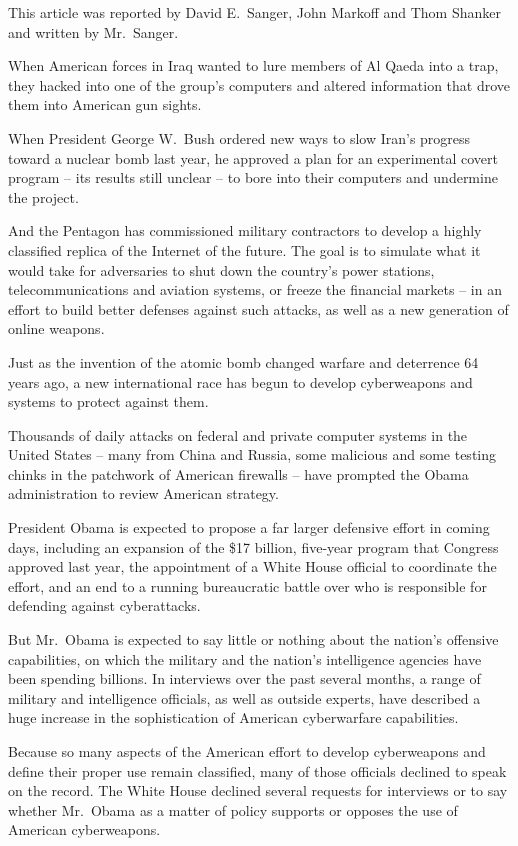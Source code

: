 \documentclass[12pt,a4paper,onecolumn]{article}
\begin{document}
This article was reported by David E.~Sanger, John Markoff and Thom Shanker and written by
Mr.~Sanger.

When American forces in Iraq wanted to lure members of Al Qaeda into a trap, they hacked into one of
the group's computers and altered information that drove them into American gun sights.

When President George W.~Bush ordered new ways to slow Iran's progress toward a nuclear bomb last
year, he approved a plan for an experimental covert program -- its results still unclear -- to bore
into their computers and undermine the project.

And the Pentagon has commissioned military contractors to develop a highly classified replica of the
Internet of the future. The goal is to simulate what it would take for adversaries to shut down the
country's power stations, telecommunications and aviation systems, or freeze the financial markets
-- in an effort to build better defenses against such attacks, as well as a new generation of online
weapons.

Just as the invention of the atomic bomb changed warfare and deterrence 64 years ago, a new
international race has begun to develop cyberweapons and systems to protect against them.

Thousands of daily attacks on federal and private computer systems in the United States -- many from
China and Russia, some malicious and some testing chinks in the patchwork of American firewalls --
have prompted the Obama administration to review American strategy.

President Obama is expected to propose a far larger defensive effort in coming days, including an
expansion of the \$17 billion, five-year program that Congress approved last year, the appointment
of a White House official to coordinate the effort, and an end to a running bureaucratic battle over
who is responsible for defending against cyberattacks.

But Mr.~Obama is expected to say little or nothing about the nation's offensive capabilities, on
which the military and the nation's intelligence agencies have been spending billions. In interviews
over the past several months, a range of military and intelligence officials, as well as outside
experts, have described a huge increase in the sophistication of American cyberwarfare capabilities.

Because so many aspects of the American effort to develop cyberweapons and define their proper use
remain classified, many of those officials declined to speak on the record. The White House declined
several requests for interviews or to say whether Mr.~Obama as a matter of policy supports or
opposes the use of American cyberweapons.
\end{document}

